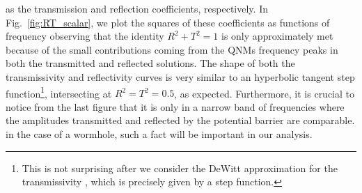 \documentclass[article,aps,nofootinbib,twocolumn,superscriptaddress]{revtex4-1}
\begin{document}
as the transmission and reflection coefficients, respectively. In Fig.~\ref{fig:RT_scalar}, we plot the squares of these coefficients as functions of frequency observing that the identity $R^2+T^2=1$ is only approximately met because of the small contributions coming from the QNMs frequency peaks in both the transmitted and reflected solutions. The shape of both the transmissivity and reflectivity curves is very similar to an hyperbolic tangent step function\footnote{This is not surprising after we consider the DeWitt approximation for the transmissivity \citep{DeWitt:1975ys,Frolov:1998wf}, which is precisely given by a step function.}, intersecting at $R^2=T^2=0.5$, as expected. Furthermore, it is crucial to notice from the last figure that it is only in a narrow band of frequencies where the amplitudes transmitted and reflected by the potential barrier are comparable. in the case of a wormhole, such a fact will be important in our analysis.  
\end{document}

